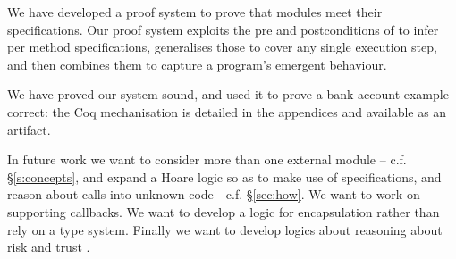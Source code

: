 We have developed a proof system to prove that modules meet their specifications.  Our proof system exploits the
pre and
postconditions of \funcSpecs to infer per method \Nec specifications, 
generalises those to cover any single execution step,
and then combines them to capture a program's emergent behaviour.
%
%
%
%
%

%
%
{We} have proved our system sound, and used it to
prove a bank account example correct: the Coq mechanisation is
detailed in the appendices  and available as an artifact.

%
%
%
%

%
%





In future work we want to consider more than one external module -- c.f. \S \ref{s:concepts},
and expand a Hoare logic so as to make use of
\Nec specifications, and reason about calls into unknown code
- c.f. \S \ref{sec:how}. 
We want to work on supporting callbacks.
We want to develop a logic for encapsulation rather than rely on a type system.
Finally we want to develop logics about reasoning about risk and trust \cite{swapsies}.

